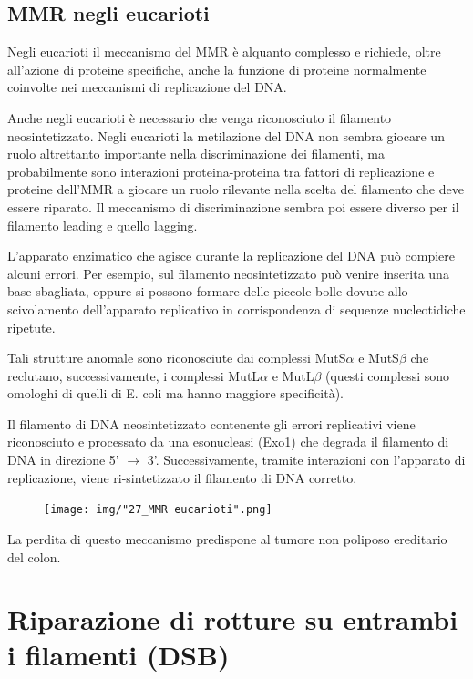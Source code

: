 \documentclass[11pt]{book}
\begin{document}
\clearpage

\subsection{MMR negli eucarioti}\label{mmr-negli-eucarioti}

Negli eucarioti il meccanismo del MMR è alquanto complesso e richiede,
oltre all'azione di proteine specifiche, anche la funzione di proteine
normalmente coinvolte nei meccanismi di replicazione del DNA.

Anche negli eucarioti è necessario che venga riconosciuto il filamento
neosintetizzato. Negli eucarioti la metilazione del DNA non sembra
giocare un ruolo altrettanto importante nella discriminazione dei
filamenti, ma probabilmente sono interazioni proteina-proteina tra
fattori di replicazione e proteine dell'MMR a giocare un ruolo rilevante
nella scelta del filamento che deve essere riparato. Il meccanismo di
discriminazione sembra poi essere diverso per il filamento leading e
quello lagging.

L'apparato enzimatico che agisce durante la replicazione del DNA può
compiere alcuni errori. Per esempio, sul filamento neosintetizzato può
venire inserita una base sbagliata, oppure si possono formare delle
piccole bolle dovute allo scivolamento dell'apparato replicativo in
corrispondenza di sequenze nucleotidiche ripetute.

Tali strutture anomale sono riconosciute dai complessi MutS\(\alpha\) e
MutS\(\beta\) che reclutano, successivamente, i complessi MutL\(\alpha\)
e MutL\(\beta\) (questi complessi sono omologhi di quelli di E. coli ma
hanno maggiore specificità).

Il filamento di DNA neosintetizzato contenente gli errori replicativi
viene riconosciuto e processato da una esonucleasi (Exo1) che degrada il
filamento di DNA in direzione 5' \(\rightarrow\) 3'. Successivamente,
tramite interazioni con l'apparato di replicazione, viene
ri-sintetizzato il filamento di DNA corretto.

\clearpage

\begin{figure}[htp]
\centering
\texttt{[image: img/"27\_MMR eucarioti".png]}
\caption{}
\label{mmr-eucarioti}
\end{figure}

La perdita di questo meccanismo predispone al tumore non poliposo
ereditario del colon.

\clearpage

\section{Riparazione di rotture su entrambi i filamenti
(DSB)}\label{riparazione-di-rotture-su-entrambi-i-filamenti-dsb}
\end{document}
